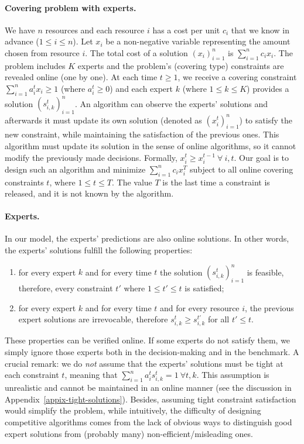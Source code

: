 \paragraph{Covering problem with experts.}
We have $n$ resources and each resource $i$ has a cost per unit $c_{i}$ that we know in advance ($1 \leq i \leq n$).
Let $x_{i}$ be a non-negative variable representing the amount chosen from resource $i$.
The total cost of a solution $(x_{i})_{i=1}^{n}$ is $\sum_{i=1}^{n} c_{i} x_{i}$.
The problem includes $K$ experts and the problem's (covering type) constraints are revealed online (one by one).
At each time $t \geq 1$, we receive a covering constraint $\sum_{i=1}^{n} a_{i}^{t} x_{i} \geq 1$ (where $a_{i}^{t} \geq 0$) and each expert $k$ (where $1 \leq k \leq K$) provides
a solution $(s_{i,k}^{t})_{i=1}^{n}$. An algorithm can observe the experts' solutions and afterwards it must update its own solution (denoted as $(x_{i}^{t})_{i=1}^{n}$)
to satisfy the new constraint, while maintaining the satisfaction of the previous ones. This algorithm must update its solution in the sense of online algorithms, so it cannot modify the previously made decisions. Formally, $x_{i}^{t} \geq x_{i}^{t-1} ~\forall\ i, t$.
Our goal is to design such an algorithm and minimize $\sum_{i=1}^{n} c_{i} x_{i}^{T}$ subject to
all online covering constraints $t$, where $1 \leq t \leq T$. The value $T$ is the last time a constraint is released, and it is not known by the algorithm.


\paragraph{Experts.} In our model, the experts' predictions are also online solutions. In other words, the experts' solutions
fulfill the following properties:
\begin{enumerate}
	\item for every expert $k$ and for every time $t$ the solution $(s_{i,k}^{t})_{i=1}^{n}$ is feasible, therefore, every constraint $t'$ where $1 \leq t' \leq t$ is satisfied;
	\item for every expert $k$ and for every time $t$ and for every resource $i$, the previous expert solutions are irrevocable, therefore $s_{i,k}^{t} \geq s_{i,k}^{t'}$ for all $t' \leq t$.
\end{enumerate}
These properties can be verified online. If some experts do not satisfy them, we simply ignore those experts both in the decision-making and in the benchmark.
A crucial remark: we do \emph{not} assume that the experts' solutions must be tight at each constraint $t$, meaning that $\sum_{i=1}^{n} a_{i}^{t} s_{i,k}^{t} = 1 ~ \forall t, k$.
This assumption is unrealistic and cannot be maintained in an online manner (see the discussion in Appendix~\ref{appix-tight-solutions}).
Besides, assuming tight constraint satisfaction would simplify the problem, while intuitively,
the difficulty of designing competitive algorithms comes from the lack of obvious ways to distinguish
good expert solutions from (probably many) non-efficient/misleading ones.


